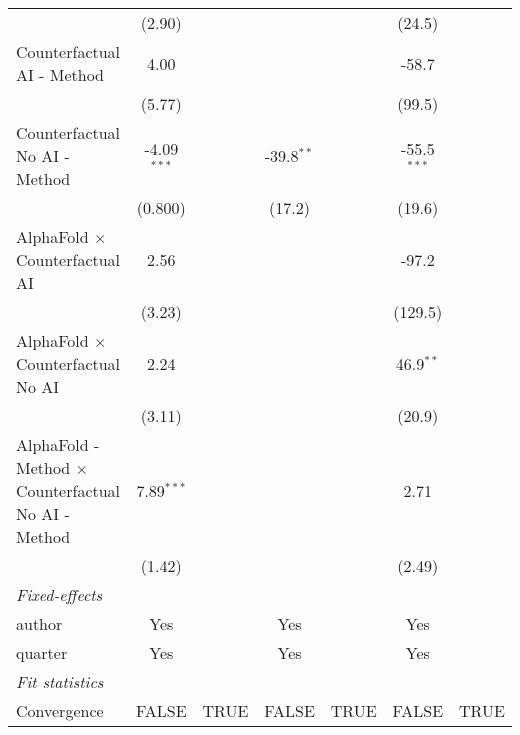 \begin{tabular}{lcccccc}
                                                              & (2.90)        &      &                &      & (24.5)        &   \\   
   Counterfactual AI - Method                                 & 4.00          &      &                &      & -58.7         &   \\   
                                                              & (5.77)        &      &                &      & (99.5)        &   \\   
   Counterfactual No AI - Method                              & -4.09$^{***}$ &      & -39.8$^{**}$   &      & -55.5$^{***}$ &   \\   
                                                              & (0.800)       &      & (17.2)         &      & (19.6)        &   \\   
   AlphaFold $\times$ Counterfactual AI                       & 2.56          &      &                &      & -97.2         &   \\   
                                                              & (3.23)        &      &                &      & (129.5)       &   \\   
   AlphaFold $\times$ Counterfactual No AI                    & 2.24          &      &                &      & 46.9$^{**}$   &   \\   
                                                              & (3.11)        &      &                &      & (20.9)        &   \\   
   AlphaFold - Method $\times$ Counterfactual No AI - Method  & 7.89$^{***}$  &      &                &      & 2.71          &   \\   
                                                              & (1.42)        &      &                &      & (2.49)        &   \\   
   \midrule
   \emph{Fixed-effects}\\
   author                                                     & Yes           &      & Yes            &      & Yes           & \\  
   quarter                                                    & Yes           &      & Yes            &      & Yes           & \\  
   \midrule
   \emph{Fit statistics}\\
   Convergence                                                &FALSE          & TRUE & FALSE          & TRUE & FALSE         & TRUE\\  

\end{tabular}

